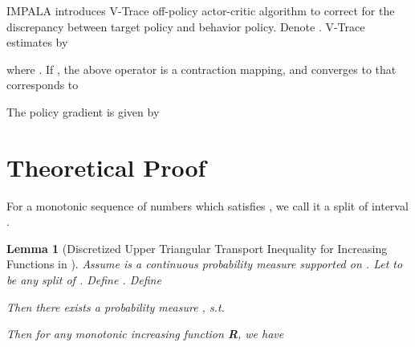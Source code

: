 \documentclass[nohyperref]{article}
\theoremstyle{plain}
\newtheorem{Lemma}{\textbf{Lemma}}
\begin{document}
IMPALA \citep{impala} introduces V-Trace off-policy actor-critic algorithm to correct for the discrepancy between target policy and behavior policy. Denote . V-Trace estimates  by

where . 
If , the above operator is a contraction mapping, and  converges to  that corresponds to 

The policy gradient is given by


\clearpage

\section{Theoretical Proof}
\label{App: proof}

For a monotonic sequence of numbers which satisfies ,
we call it a split of interval .

\begin{Lemma}[Discretized Upper Triangular Transport Inequality for Increasing Functions in ]
Assume  is a continuous probability measure supported on . 
Let  to be any split of .
Define . 
Define 
 
Then there exists a probability measure , s.t. 

Then for any monotonic increasing function  \textbf{R},
we have

\label{lemma:dct_inc_R1}
\end{Lemma}
\end{document}
